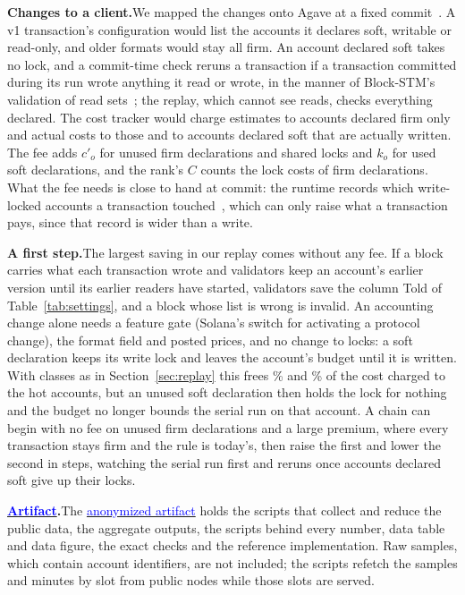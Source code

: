 \documentclass[conference,compsoc]{IEEEtran}
\newcommand{\artifactlink}[1]{\texorpdfstring{\href{https://github.com/submissionrepo/declared-fees-artifact}{\textcolor{blue}{#1}}}{#1}}
\numberwithin{equation}{section}
\theoremstyle{plain}
\theoremstyle{definition}
\theoremstyle{remark}
\newcommand{\runin}[1]{\par\smallskip\noindent\textbf{#1.}\enspace}
\newcommand{\cp}{c'}
\begin{document}
\runin{Changes to a client}We mapped the changes onto Agave at a fixed commit~\cite{agave}. A v1 transaction's configuration would list the accounts it declares soft, writable or read-only, and older formats would stay all firm. An account declared soft takes no lock, and a commit-time check reruns a transaction if a transaction committed during its run wrote anything it read or wrote, in the manner of Block-STM's validation of read sets~\cite{gelashvili2023blockstm}; the replay, which cannot see reads, checks everything declared. The cost tracker would charge estimates to accounts declared firm only and actual costs to those and to accounts declared soft that are actually written. The fee adds $\cp_o$ for unused firm declarations and shared locks and $k_o$ for used soft declarations, and the rank's $C$ counts the lock costs of firm declarations. What the fee needs is close to hand at commit: the runtime records which write-locked accounts a transaction touched~\cite{agave}, which can only raise what a transaction pays, since that record is wider than a write.

\runin{A first step}The largest saving in our replay comes without any fee. If a block carries what each transaction wrote and validators keep an account's earlier version until its earlier readers have started, validators save the column Told of Table~\ref{tab:settings}, and a block whose list is wrong is invalid. An accounting change alone needs a feature gate (Solana's switch for activating a protocol change), the format field and posted prices, and no change to locks: a soft declaration keeps its write lock and leaves the account's budget until it is written. With classes as in Section~\ref{sec:replay} this frees \freedLoA\% and \freedLoB\% of the cost charged to the hot accounts, but an unused soft declaration then holds the lock for nothing and the budget no longer bounds the serial run on that account. A chain can begin with no fee on unused firm declarations and a large premium, where every transaction stays firm and the rule is today's, then raise the first and lower the second in steps, watching the serial run first and reruns once accounts declared soft give up their locks.

\runin{\artifactlink{Artifact}}The \artifactlink{anonymized artifact} holds the scripts that collect and reduce the public data, the aggregate outputs, the scripts behind every number, data table and data figure, the exact checks and the reference implementation. Raw samples, which contain account identifiers, are not included; the scripts refetch the samples and minutes by slot from public nodes while those slots are served.
\end{document}
